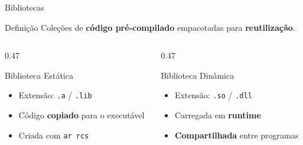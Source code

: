 \documentclass[aspectratio=169, 11pt]{beamer}
\begin{document}
\begin{frame}{Bibliotecas}
  \begin{block}{Definição}
    Coleções de \textbf{código pré-compilado} empacotadas para \textbf{reutilização}.
  \end{block}
  \vspace{0.3cm}
  \begin{columns}[T]
    \begin{column}{0.47\textwidth}
      \begin{exampleblock}{Biblioteca Estática}
        \begin{itemize}
          \item Extensão: \texttt{.a} / \texttt{.lib}
          \item Código \textbf{copiado} para o executável
          \item Criada com \texttt{ar rcs}
        \end{itemize}
      \end{exampleblock}
    \end{column}
    \begin{column}{0.47\textwidth}
      \begin{alertblock}{Biblioteca Dinâmica}
        \begin{itemize}
          \item Extensão: \texttt{.so} / \texttt{.dll}
          \item Carregada em \textbf{runtime}
          \item \textbf{Compartilhada} entre programas
        \end{itemize}
      \end{alertblock}
    \end{column}
  \end{columns}
\end{frame}
\end{document}
